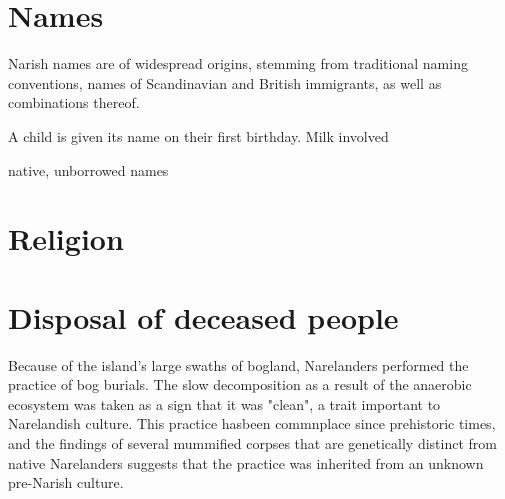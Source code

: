 \documentclass[a4paper,11pt,twoside,openright]{memoir}
\begin{document}
\chapter{Names}

Narish names are of widespread origins, stemming from traditional naming conventions, names of Scandinavian and British immigrants, as well as combinations thereof.

A child is given its name on their first birthday. Milk involved

native, unborrowed names

\chapter{Religion}

\chapter{Disposal of deceased people}

Because of the island's large swaths of bogland, Narelanders performed the practice of bog burials. The slow decomposition as a result of the anaerobic ecosystem was taken as a sign that it was "clean", a trait important to Narelandish culture. This practice hasbeen commnplace since prehistoric times, and the findings of several mummified corpses that are genetically distinct from native Narelanders suggests that the practice was inherited from an unknown pre-Narish culture.
\end{document}
